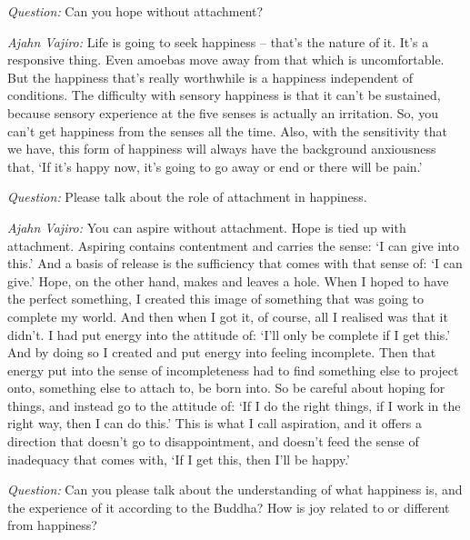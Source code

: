 \enlargethispage{\baselineskip}

\bigskip

\emph{Question:} Can you hope without attachment?

\emph{Ajahn Vajiro:} Life is going to seek happiness -- that's the nature of it. It's a
responsive thing. Even amoebas move away from that which is uncomfortable. But
the happiness that's really worthwhile is a happiness independent of conditions.
The difficulty with sensory happiness is that it can't be sustained, because
sensory experience at the five senses is actually an irritation. So, you can't get happiness from
the senses all the time. Also, with the sensitivity that we have, this form of
happiness will always have the background anxiousness that, `If it's happy now, it's
going to go away or end or there will be pain.'

\bigskip

\emph{Question:} Please talk about the role of attachment in happiness.

\emph{Ajahn Vajiro:} You can aspire without attachment. Hope is tied up with
attachment. Aspiring contains contentment and carries the sense: `I can give into this.' And a basis of
release is the sufficiency that comes with that sense of: `I can give.' Hope, on
the other hand, makes and leaves a hole. When I hoped to have the perfect
something, I created this image of something that was going to complete my
world. And then when I got it, of course, all I realised was that it didn't. I
had put energy into the attitude of: `I'll only be complete if I get this.' And
by doing so I created and put energy into feeling incomplete. Then that energy put into the sense of incompleteness had to find something else to project onto,
something else to attach to, be born into. So be careful about hoping for things, and instead
go to the attitude of: `If I do the right things, if I work in the right way,
then I can do this.' This is what I call aspiration, and it offers a direction
that doesn't go to disappointment, and doesn't feed the sense of inadequacy that
comes with, `If I get this, then I'll be happy.'

\bigskip

\emph{Question:} Can you please talk about the understanding of what happiness is, and
the experience of it according to the Buddha? How is joy related to or different
from happiness?

